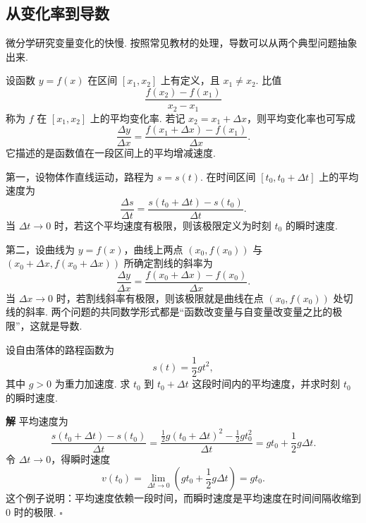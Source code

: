\documentclass[fontset=fandol]{ctexart}
\newenvironment{solution}{\par\noindent\textbf{解}\quad}{\hfill$\square$\par\vspace{0.8em}}
\begin{document}
\subsection{从变化率到导数}

微分学研究变量变化的快慢. 按照常见教材的处理，导数可以从两个典型问题抽象出来.

\begin{definition}[平均变化率]
设函数 $y=f(x)$ 在区间 $[x_1,x_2]$ 上有定义，且 $x_1\neq x_2$. 比值
\[
\frac{f(x_2)-f(x_1)}{x_2-x_1}
\]
称为 $f$ 在 $[x_1,x_2]$ 上的平均变化率. 若记 $x_2=x_1+\Delta x$，则平均变化率也可写成
\[
\frac{\Delta y}{\Delta x}
=\frac{f(x_1+\Delta x)-f(x_1)}{\Delta x}.
\]
它描述的是函数值在一段区间上的平均增减速度.
\end{definition}

第一，设物体作直线运动，路程为 $s=s(t)$. 在时间区间 $[t_0,t_0+\Delta t]$ 上的平均速度为
\[
\frac{\Delta s}{\Delta t}
=\frac{s(t_0+\Delta t)-s(t_0)}{\Delta t}.
\]
当 $\Delta t\to0$ 时，若这个平均速度有极限，则该极限定义为时刻 $t_0$ 的瞬时速度.

第二，设曲线为 $y=f(x)$，曲线上两点 $(x_0,f(x_0))$ 与 $(x_0+\Delta x,f(x_0+\Delta x))$ 所确定割线的斜率为
\[
\frac{\Delta y}{\Delta x}
=\frac{f(x_0+\Delta x)-f(x_0)}{\Delta x}.
\]
当 $\Delta x\to0$ 时，若割线斜率有极限，则该极限就是曲线在点 $(x_0,f(x_0))$ 处切线的斜率. 两个问题的共同数学形式都是“函数改变量与自变量改变量之比的极限”，这就是导数.

\begin{center}
\end{center}

\begin{example}[平均速度与瞬时速度]
设自由落体的路程函数为
\[
s(t)=\frac12gt^2,
\]
其中 $g>0$ 为重力加速度. 求 $t_0$ 到 $t_0+\Delta t$ 这段时间内的平均速度，并求时刻 $t_0$ 的瞬时速度.
\end{example}
\begin{solution}
平均速度为
\[
\frac{s(t_0+\Delta t)-s(t_0)}{\Delta t}
=\frac{\frac12g(t_0+\Delta t)^2-\frac12gt_0^2}{\Delta t}
=gt_0+\frac12g\Delta t.
\]
令 $\Delta t\to0$，得瞬时速度
\[
v(t_0)=\lim_{\Delta t\to0}\left(gt_0+\frac12g\Delta t\right)=gt_0.
\]
这个例子说明：平均速度依赖一段时间，而瞬时速度是平均速度在时间间隔收缩到 $0$ 时的极限.
\end{solution}
\end{document}
